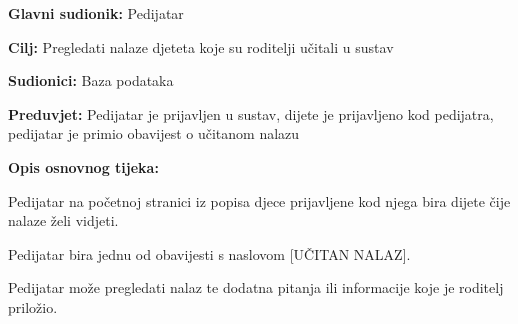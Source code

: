					\noindent {}
					\begin{packed_item}
						
						\item \textbf{Glavni sudionik: }Pedijatar
						\item  \textbf{Cilj:} Pregledati nalaze djeteta koje su roditelji učitali u sustav
						\item  \textbf{Sudionici:} Baza podataka
						\item  \textbf{Preduvjet:} Pedijatar je prijavljen u sustav, dijete je prijavljeno kod pedijatra, pedijatar je primio obavijest o učitanom nalazu
						\item  \textbf{Opis osnovnog tijeka:}
						
						\item[] \begin{packed_enum}
							
							\item Pedijatar na početnoj stranici iz popisa djece prijavljene kod njega bira dijete čije nalaze želi vidjeti.
							\item Pedijatar bira jednu od obavijesti s naslovom [UČITAN NALAZ].
							\item Pedijatar može pregledati nalaz te dodatna pitanja ili informacije koje je roditelj priložio.
						\end{packed_enum}
						
						
					\end{packed_item}
					
